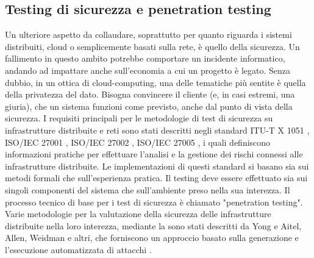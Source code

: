 \documentclass[../main.tex]{subfiles}
\begin{document}
\subsection{Testing di sicurezza e penetration testing}
Un ulteriore aspetto da collaudare, soprattutto per quanto riguarda i sistemi distribuiti, cloud o semplicemente basati sulla rete, è quello della sicurezza.
Un fallimento in questo ambito potrebbe comportare un incidente informatico, andando ad impattare anche sull'economia a cui un progetto è legato.
Senza dubbio, in un ottica di cloud-computing, una delle tematiche più sentite è quella della privatezza del dato. Bisogna convincere il cliente (e, in casi estremi, una giuria), che un sistema funzioni come previsto, anche dal punto di vista della sicurezza.
I requisiti principali per le metodologie di test di sicurezza su infrastrutture distribuite e reti sono stati descritti negli standard ITU-T X 1051 \cite{disttestITUTX1051}, ISO/IEC 27001 \cite{iso27001}, ISO/IEC 27002 \cite{iso27002}, ISO/IEC 27005 \cite{iso27005}, i quali definiscono informazioni pratiche per effettuare l'analisi e la gestione dei rischi connessi alle infrastrutture distribuite.
Le implementazioni di questi standard si basano sia sui metodi formali che sull'esperienza pratica. Il testing deve essere effettuato sia sui singoli componenti del sistema che sull'ambiente preso nella sua interezza.
Il processo tecnico di base per i test di sicurezza è chiamato "penetration testing".
Varie metodologie per la valutazione della sicurezza delle infrastrutture distribuite nella loro interezza, mediante la sono stati descritti da Yong e Aitel, Allen, Weidman e altri, che forniscono un approccio basato sulla generazione e l'esecuzione automatizzata di attacchi \cite{disttest}.
\end{document}
